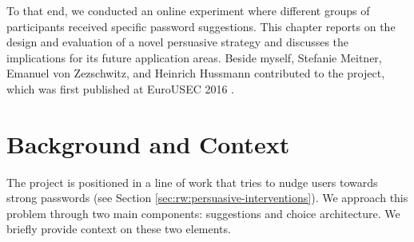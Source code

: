 To that end, we conducted an online experiment where different groups of participants received specific password suggestions. This chapter reports on the design and evaluation of a novel persuasive strategy and discusses the implications for its future application areas. Beside myself, Stefanie Meitner, Emanuel von Zezschwitz, and Heinrich Hussmann contributed to the project, which was first published at EuroUSEC 2016 \cite{Seitz2016DecoyEffect}.



\section{Background and Context}
The project is positioned in a line of work that tries to nudge users towards strong passwords (see Section \ref{sec:rw:persuasive-interventions}). We approach this problem through two main components: suggestions and choice architecture. We briefly provide context on these two elements.  



